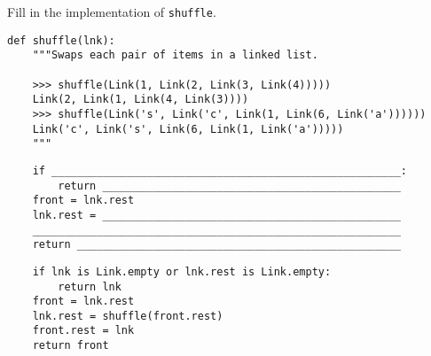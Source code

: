 \begin{blocksection}
\question Fill in the implementation of \lstinline$shuffle$.

\begin{lstlisting}
def shuffle(lnk):
    """Swaps each pair of items in a linked list.

    >>> shuffle(Link(1, Link(2, Link(3, Link(4)))))
    Link(2, Link(1, Link(4, Link(3))))
    >>> shuffle(Link('s', Link('c', Link(1, Link(6, Link('a'))))))
    Link('c', Link('s', Link(6, Link(1, Link('a')))))
    """
\end{lstlisting}

\ifprintanswers\else
\begin{lstlisting}
    if _______________________________________________________:
        return _______________________________________________
    front = lnk.rest
    lnk.rest = _______________________________________________
    __________________________________________________________
    return ___________________________________________________
\end{lstlisting}
\fi

\begin{solution}
\begin{lstlisting}
    if lnk is Link.empty or lnk.rest is Link.empty:
        return lnk
    front = lnk.rest
    lnk.rest = shuffle(front.rest)
    front.rest = lnk
    return front
\end{lstlisting}
\end{solution}
\end{blocksection}
